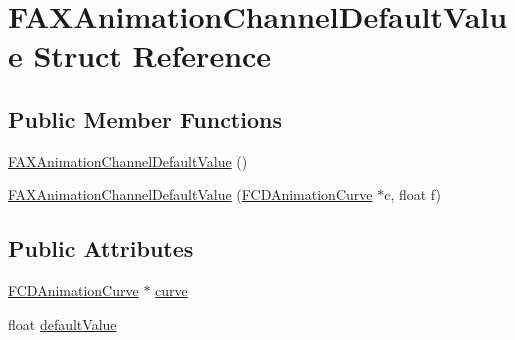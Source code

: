 \hypertarget{structFAXAnimationChannelDefaultValue}{
\section{FAXAnimationChannelDefaultValue Struct Reference}
\label{structFAXAnimationChannelDefaultValue}
}
\subsection*{Public Member Functions}
\begin{DoxyCompactItemize}
\item 
\hyperlink{structFAXAnimationChannelDefaultValue_acdfc806047c445a38b3db8014cf9fb33}{FAXAnimationChannelDefaultValue} ()
\item 
\hyperlink{structFAXAnimationChannelDefaultValue_ab75ce7cbfa439e6c8b38e3a9d4cacf27}{FAXAnimationChannelDefaultValue} (\hyperlink{classFCDAnimationCurve}{FCDAnimationCurve} $\ast$c, float f)
\end{DoxyCompactItemize}
\subsection*{Public Attributes}
\begin{DoxyCompactItemize}
\item 
\hyperlink{classFCDAnimationCurve}{FCDAnimationCurve} $\ast$ \hyperlink{structFAXAnimationChannelDefaultValue_aa2acbd5661a378862458fd0e392c8dec}{curve}
\item 
float \hyperlink{structFAXAnimationChannelDefaultValue_a03faf32f6146a54daa1902baf93edde4}{defaultValue}
\end{DoxyCompactItemize}



